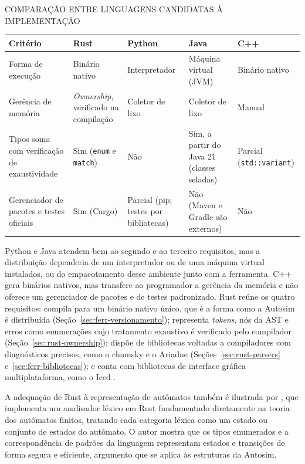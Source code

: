 \documentclass[
    12pt
    ,oneside
    ,a4paper
    ,chapter=TITLE
    ,section=TITLE
    ,sumario=abnt-6027-2012]{abntex2}
\begin{document}
\begin{quadro}[h]
    \centering
    \caption{COMPARAÇÃO ENTRE LINGUAGENS CANDIDATAS À IMPLEMENTAÇÃO}
    \label{quad:linguagens}
    \small
    \begin{tabularx}{\textwidth}{|>{\raggedright\arraybackslash}p{3.4cm}|Z|Z|Z|Z|}
        \hline
        \textbf{Critério} & \textbf{Rust} & \textbf{Python} & \textbf{Java} & \textbf{C++} \\
        \hline
        Forma de execução & Binário nativo & Interpretador & Máquina virtual (JVM) & Binário nativo \\
        \hline
        Gerência de memória & \textit{Ownership}, verificado na compilação & Coletor de lixo & Coletor de lixo & Manual \\
        \hline
        Tipos soma com verificação de exaustividade & Sim (\texttt{enum} e \texttt{match}) & Não & Sim, a partir do Java 21 (classes seladas) & Parcial (\texttt{std::}\allowbreak\texttt{variant}) \\
        \hline
        Gerenciador de pacotes e testes oficiais & Sim (Cargo) & Parcial (pip; testes por bibliotecas) & Não (Maven e Gradle são externos) & Não \\
        \hline
    \end{tabularx}
\end{quadro}

Python e Java atendem bem ao segundo e ao terceiro requisitos, mas a distribuição dependeria
de um interpretador ou de uma máquina virtual instalados, ou do empacotamento desse ambiente
junto com a ferramenta. C++ gera binários nativos, mas transfere ao programador a gerência da
memória e não oferece um gerenciador de pacotes e de testes padronizado. Rust reúne os
quatro requisitos: compila para um binário nativo único, que é a forma como a Autosim é
distribuída (Seção~\ref{sec:ferr-versionamento}); representa \textit{tokens}, nós da AST e
erros como enumerações cujo tratamento exaustivo é verificado pelo compilador
(Seção~\ref{sec:rust-ownership}); dispõe de bibliotecas voltadas a compiladores com
diagnósticos precisos, como o chumsky e o Ariadne (Seções~\ref{sec:rust-parsers}
e~\ref{sec:ferr-bibliotecas}); e conta com bibliotecas de interface gráfica multiplataforma,
como o Iced \cite{iced2022}.

A adequação de Rust à representação de autômatos também é ilustrada por
, que implementa um analisador léxico em Rust fundamentado
diretamente na teoria dos autômatos finitos, tratando cada categoria léxica como um estado ou
conjunto de estados do autômato. O autor mostra que os tipos enumerados e a correspondência de
padrões da linguagem representam estados e transições de forma segura e eficiente, argumento
que se aplica às estruturas da Autosim.
\end{document}
